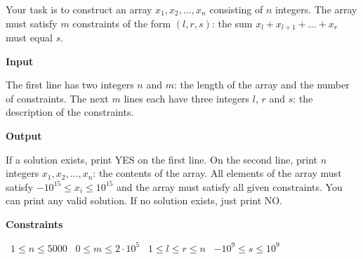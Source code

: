 Your task is to construct an array $x_1,x_2,\dots,x_n$ consisting of $n$ integers.
The array must satisfy $m$ constraints of the form $(l,r,s)$: the sum $x_l + x_{l+1} + \dots  + x_r$ must equal $s$.

\vspace{0.3cm}\noindent\textbf{Input}

The first line has two integers $n$ and $m$: the length of the array and the number of constraints.
The next $m$ lines each have three integers $l$, $r$ and $s$: the description of the constraints.

\vspace{0.3cm}\noindent\textbf{Output}

If a solution exists, print YES on the first line.
On the second line, print $n$ integers $x_1, x_2,\dots, x_n$: the contents of the array. All elements of the array must satisfy $-10^{15} \le x_i \le 10^{15}$ and the array must satisfy all given constraints. You can print any valid solution.
If no solution exists, just print NO.

\vspace{0.3cm}\noindent\textbf{Constraints}

\textbullet\ $1 \le n \le 5000$
\textbullet\ $0 \le m \le 2 \cdot 10^5$
\textbullet\ $1 \le l \le r \le n$
\textbullet\ $-10^9 \le s \le 10^9$